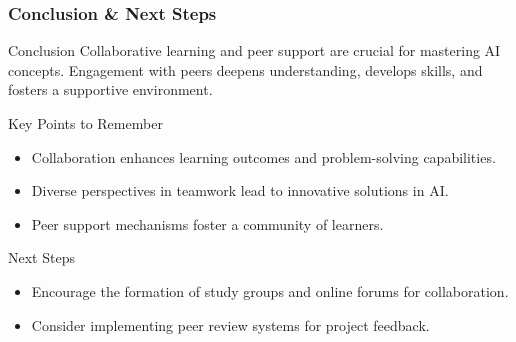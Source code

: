 \documentclass[aspectratio=169]{beamer}
\begin{document}
\begin{frame}[fragile]
    \frametitle{Conclusion \& Next Steps}
    \begin{block}{Conclusion}
        Collaborative learning and peer support are crucial for mastering AI concepts. Engagement with peers deepens understanding, develops skills, and fosters a supportive environment.
    \end{block}
    \begin{block}{Key Points to Remember}
        \begin{itemize}
            \item Collaboration enhances learning outcomes and problem-solving capabilities.
            \item Diverse perspectives in teamwork lead to innovative solutions in AI.
            \item Peer support mechanisms foster a community of learners.
        \end{itemize}
    \end{block}
    \begin{block}{Next Steps}
        \begin{itemize}
            \item Encourage the formation of study groups and online forums for collaboration.
            \item Consider implementing peer review systems for project feedback.
        \end{itemize}
    \end{block}
\end{frame}
\end{document}
